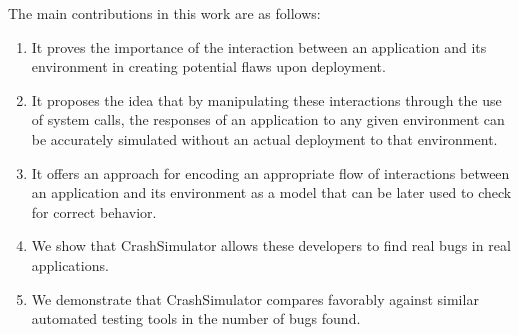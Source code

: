 The main contributions in this work are as follows:
\begin{enumerate}
\item{It proves the importance of the interaction between an application
and its environment in creating potential flaws upon deployment.}

\item{It proposes the idea that by manipulating these interactions through
the use of system calls, the responses of an application to any given
environment can be accurately simulated without an actual
deployment to that environment.}

\item{It offers an approach for encoding an appropriate flow of
interactions between an application and its environment as a model that
can be later used to check for correct behavior.}

\item We show that CrashSimulator allows these developers to find real bugs
in real applications.

\item We demonstrate that CrashSimulator compares favorably against similar
automated testing tools in the number of bugs found.

\end{enumerate}
